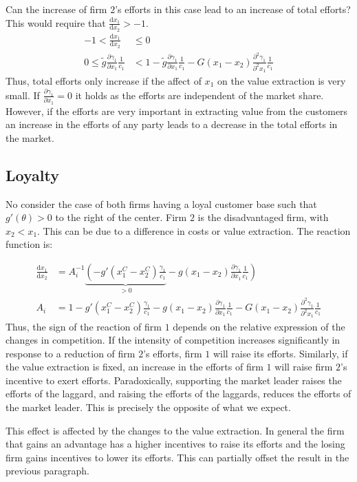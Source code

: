 \documentclass[a4paper, 11pt]{article}
\renewcommand{\d}{\text{d}}
\begin{document}
Can the increase of firm $2$'s efforts in this case lead to an increase of total efforts? This would require that $\frac{\d x_1}{\d x_2} >-1$.
\begin{align*}
-1<\frac{\d x_1}{\d x_2}&\leq0\\
0\leq\tilde{g}\frac{\partial \gamma_1}{\partial x_1}\frac{1}{c_1}&<1 -\tilde{g}\frac{\partial \gamma_1}{\partial x_1}\frac{1}{c_1}-G(x_1-x_2)\frac{\partial^2 \gamma_1}{\partial^2 x_1}\frac{1}{c_1}
\end{align*}
Thus, total efforts only increase if the affect of $x_1$ on the value extraction is very small. If $\frac{\partial \gamma_1}{\partial x_1}=0$ it holds as the efforts are independent of the market share. However, if the efforts are very important in extracting value from the customers an increase in the efforts of any party leads to a decrease in the total efforts in the market.

\subsection{Loyalty}
No consider the case of both firms having a loyal customer base such that $g'(\theta)>0$ to the right of the center. Firm $2$ is the disadvantaged firm, with $x_2<x_1$. This can be due to a difference in costs or value extraction. The reaction function is:

\begin{align}
\frac{\d x_1}{\d x_2} &= A_i^{-1} \underbrace{\left(-g'(x_1^C-x_2^C)\frac{\gamma_1}{c_1}\right.}_{>0} - \left.g(x_1-x_2)\frac{\partial \gamma_1}{\partial x_1}\frac{1}{c_1}\right)\\
A_i &= 1 - g'(x_1^C-x_2^C)\frac{\gamma_1}{c_1}-g(x_1-x_2)\frac{\partial \gamma_1}{\partial x_1}\frac{1}{c_1}-G(x_1-x_2)\frac{\partial^2 \gamma_1}{\partial^2 x_1}\frac{1}{c_1}
\end{align}
Thus, the sign of the reaction of firm $1$ depends on the relative expression of the changes in competition. If the intensity of competition increases significantly in response to a reduction of firm $2$'s efforts, firm $1$ will raise its efforts. Similarly, if the value extraction is fixed, an increase in the efforts of firm $1$ will raise firm $2$'s incentive to exert efforts. Paradoxically, supporting the market leader raises the efforts of the laggard, and raising the efforts of the laggards, reduces the efforts of the market leader. This is precisely the opposite of what we expect. 

This effect is affected by the changes to the value extraction. In general the firm that gains an advantage has a higher incentives to raise its efforts and the losing firm gains incentives to lower its efforts. This can partially offset the result in the previous paragraph.
\end{document}
